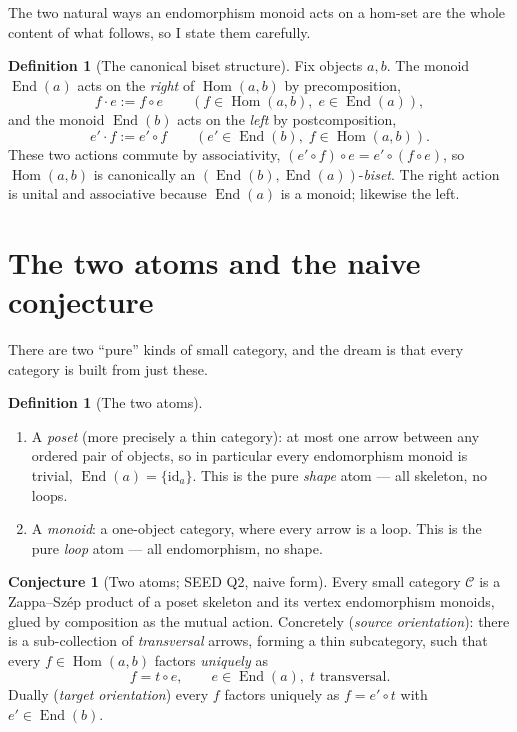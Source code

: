 \documentclass[11pt]{article}
\theoremstyle{definition}
\newtheorem{definition}[theorem]{Definition}
\newtheorem{conjecture}[theorem]{Conjecture}
\newcommand{\Hom}{\operatorname{Hom}}
\newcommand{\End}{\operatorname{End}}
\newcommand{\id}{\mathrm{id}}
\newcommand{\C}{\mathcal{C}}
\begin{document}
The two natural ways an endomorphism monoid acts on a hom-set are the whole
content of what follows, so I state them carefully.

\begin{definition}[The canonical biset structure]
Fix objects $a,b$. The monoid $\End(a)$ acts on the \emph{right} of $\Hom(a,b)$
by precomposition,
\[
  f \cdot e := f \circ e \qquad (f \in \Hom(a,b),\; e \in \End(a)),
\]
and the monoid $\End(b)$ acts on the \emph{left} by postcomposition,
\[
  e' \cdot f := e' \circ f \qquad (e' \in \End(b),\; f \in \Hom(a,b)).
\]
These two actions commute by associativity, $(e' \circ f) \circ e = e' \circ
(f \circ e)$, so $\Hom(a,b)$ is canonically an
$(\End(b),\End(a))$-\emph{biset}. The right action is unital and associative
because $\End(a)$ is a monoid; likewise the left.
\end{definition}

\section{The two atoms and the naive conjecture}

There are two ``pure'' kinds of small category, and the dream is that every
category is built from just these.

\begin{definition}[The two atoms]
\leavevmode
\begin{enumerate}
\item A \emph{poset} (more precisely a thin category): at most one arrow between
any ordered pair of objects, so in particular every endomorphism monoid is
trivial, $\End(a) = \{\id_a\}$. This is the pure \emph{shape} atom --- all
skeleton, no loops.
\item A \emph{monoid}: a one-object category, where every arrow is a loop. This
is the pure \emph{loop} atom --- all endomorphism, no shape.
\end{enumerate}
\end{definition}

\begin{conjecture}[Two atoms; SEED Q2, naive form]\label{conj:naive}
Every small category $\C$ is a Zappa--Sz\'ep product of a poset skeleton and
its vertex endomorphism monoids, glued by composition as the mutual action.
Concretely (\emph{source orientation}): there is a sub-collection of
\emph{transversal} arrows, forming a thin subcategory, such that every $f \in
\Hom(a,b)$ factors \emph{uniquely} as
\[
  f = t \circ e, \qquad e \in \End(a),\; t \text{ transversal}.
\]
Dually (\emph{target orientation}) every $f$ factors uniquely as $f = e' \circ
t$ with $e' \in \End(b)$.
\end{conjecture}
\end{document}
